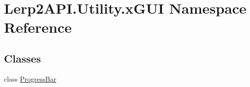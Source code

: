 \hypertarget{namespace_lerp2_a_p_i_1_1_utility_1_1x_g_u_i}{}\section{Lerp2\+A\+P\+I.\+Utility.\+x\+G\+UI Namespace Reference}
\label{namespace_lerp2_a_p_i_1_1_utility_1_1x_g_u_i}
\subsection*{Classes}
\begin{DoxyCompactItemize}
\item 
class \hyperlink{class_lerp2_a_p_i_1_1_utility_1_1x_g_u_i_1_1_progress_bar}{Progress\+Bar}
\end{DoxyCompactItemize}

